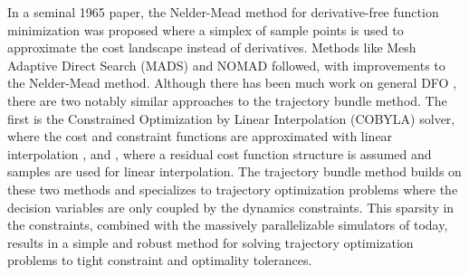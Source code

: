 In a seminal 1965 paper, the Nelder-Mead method for derivative-free function minimization was proposed where a simplex of sample points is used to approximate the cost landscape instead of derivatives. Methods like Mesh Adaptive Direct Search (MADS) \cite{audet2006} and NOMAD \cite{ledigabel2011, audet2021} followed, with improvements to the Nelder-Mead method. Although there has been much work on general DFO \cite{conn1997, kochenderfer2019,conn2009}, there are two notably similar approaches to the trajectory bundle method. The first is the Constrained Optimization by Linear Interpolation (COBYLA) solver, where the cost and constraint functions are approximated with linear interpolation \cite{powell1994}, and \cite{cartis2019}, where a residual cost function structure is assumed and samples are used for linear interpolation. The trajectory bundle method builds on these two methods and specializes to trajectory optimization problems where the decision variables are only coupled by the dynamics constraints. This sparsity in the constraints, combined with the massively parallelizable simulators of today, results in a simple and robust method for solving trajectory optimization problems to tight constraint and optimality tolerances.




